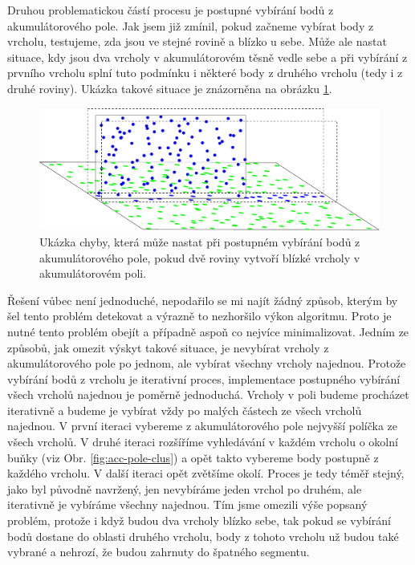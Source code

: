 \documentclass[11pt,twoside,a4paper]{book}
\begin{document}
Druhou problematickou částí procesu je postupné vybírání bodů z akumulátorového pole. Jak jsem již zmínil, pokud začneme vybírat body z vrcholu, testujeme, zda jsou ve stejné rovině a blízko u sebe. Může ale nastat situace, kdy jsou dva vrcholy v akumulátorovém těsně vedle sebe a při vybírání z prvního vrcholu splní tuto podmínku i některé body z druhého vrcholu (tedy i z druhé roviny). Ukázka takové situace je znázorněna na obrázku \ref{fig:chyba-clustering}.

\begin{figure}[ht]
\begin{center}
\includegraphics[width=\textwidth]{figures/chyba-clustering}
\caption{Ukázka chyby, která může nastat při postupném vybírání bodů z akumulátorového pole, pokud dvě roviny vytvoří blízké vrcholy v akumulátorovém poli.}
\label{fig:chyba-clustering}
\end{center}
\end{figure}

Řešení vůbec není jednoduché, nepodařilo se mi najít žádný způsob, kterým by šel tento problém detekovat a výrazně to nezhoršilo výkon algoritmu. Proto je nutné tento problém obejít a případně aspoň co nejvíce minimalizovat. Jedním ze způsobů, jak omezit výskyt takové situace, je nevybírat vrcholy z akumulátorového pole po jednom, ale vybírat všechny vrcholy najednou. Protože vybírání bodů z vrcholu je iterativní proces, implementace postupného vybírání všech vrcholů najednou je poměrně jednoduchá. Vrcholy v poli budeme procházet iterativně a budeme je vybírat vždy po malých částech ze všech vrcholů najednou. V první iteraci vybereme z akumulátorového pole nejvyšší políčka ze všech vrcholů. V druhé iteraci rozšíříme vyhledávání v každém vrcholu o okolní buňky (viz Obr. \ref{fig:acc-pole-clus}) a opět takto vybereme body postupně z každého vrcholu. V další iteraci opět zvětšíme okolí. Proces je tedy téměř stejný, jako byl původně navržený, jen nevybíráme jeden vrchol po druhém, ale iterativně je vybíráme všechny najednou. Tím jsme omezili výše popsaný problém, protože i když budou dva vrcholy blízko sebe, tak pokud se vybírání bodů dostane do oblasti druhého vrcholu, body z tohoto vrcholu už budou také vybrané a nehrozí, že budou zahrnuty do špatného segmentu.
\end{document}
